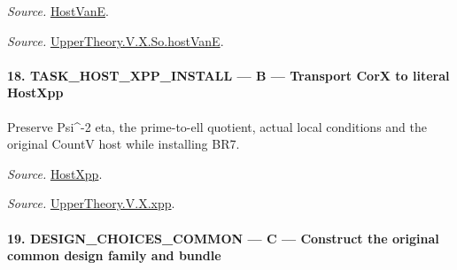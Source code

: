 \documentclass[11pt,a4paper]{article}
\numberwithin{equation}{section}
\theoremstyle{remark}\newtheorem{remark}[theorem]{Remark}
\begin{document}
\emph{Source.} \href{https://github.com/CocoSgt/riemann-hypothesis-lean/blob/7cbf7a0c32fca1badf05931879a37c3f8a2b03b4/src/Development/AutomorphicArithmetic/AutomorphicVarieties/UnitaryThreeDeformations/HostNumber.lean#L9-L12}{HostVanE}.

\emph{Source.} \href{https://github.com/CocoSgt/riemann-hypothesis-lean/blob/7cbf7a0c32fca1badf05931879a37c3f8a2b03b4/src/Development/AutomorphicArithmetic/AutomorphicVarieties/LevelCohomology/SoHostVanE.lean#L11-L18}{UpperTheory.V.X.So.hostVanE}.



\paragraph{18. TASK\_\allowbreak HOST\_\allowbreak XPP\_\allowbreak INSTALL — B — Transport CorX to literal HostXpp}

Preserve Psi\textasciicircum{}-2 eta, the prime-to-ell quotient, actual local conditions and the original CountV host while installing BR7.

\emph{Source.} \href{https://github.com/CocoSgt/riemann-hypothesis-lean/blob/7cbf7a0c32fca1badf05931879a37c3f8a2b03b4/src/Development/AutomorphicArithmetic/AutomorphicVarieties/UnitaryThreeDeformations/HostNumber.lean#L14-L17}{HostXpp}.

\emph{Source.} \href{https://github.com/CocoSgt/riemann-hypothesis-lean/blob/7cbf7a0c32fca1badf05931879a37c3f8a2b03b4/src/Development/AutomorphicArithmetic/AutomorphicVarieties/LevelCohomology/Xpp.lean#L11-L84}{UpperTheory.V.X.xpp}.



\paragraph{19. DESIGN\_\allowbreak CHOICES\_\allowbreak COMMON — C — Construct the original common design family and bundle}
\end{document}

